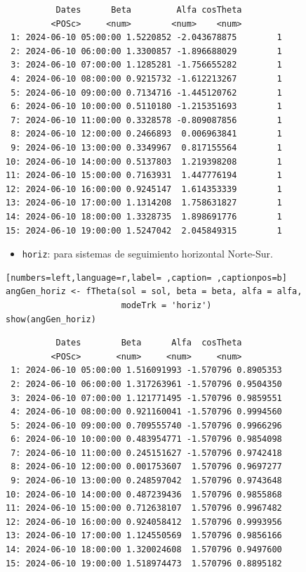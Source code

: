 \begin{itemize}
\begin{verbatim}
		  Dates      Beta         Alfa cosTheta
		 <POSc>     <num>        <num>    <num>
 1: 2024-06-10 05:00:00 1.5220852 -2.043678875        1
 2: 2024-06-10 06:00:00 1.3300857 -1.896688029        1
 3: 2024-06-10 07:00:00 1.1285281 -1.756655282        1
 4: 2024-06-10 08:00:00 0.9215732 -1.612213267        1
 5: 2024-06-10 09:00:00 0.7134716 -1.445120762        1
 6: 2024-06-10 10:00:00 0.5110180 -1.215351693        1
 7: 2024-06-10 11:00:00 0.3328578 -0.809087856        1
 8: 2024-06-10 12:00:00 0.2466893  0.006963841        1
 9: 2024-06-10 13:00:00 0.3349967  0.817155564        1
10: 2024-06-10 14:00:00 0.5137803  1.219398208        1
11: 2024-06-10 15:00:00 0.7163931  1.447776194        1
12: 2024-06-10 16:00:00 0.9245147  1.614353339        1
13: 2024-06-10 17:00:00 1.1314208  1.758631827        1
14: 2024-06-10 18:00:00 1.3328735  1.898691776        1
15: 2024-06-10 19:00:00 1.5247042  2.045849315        1
\end{verbatim}

\begin{itemize}
\item \texttt{horiz}: para sistemas de seguimiento horizontal Norte-Sur.
\end{itemize}
\begin{lstlisting}[numbers=left,language=r,label= ,caption= ,captionpos=b]
angGen_horiz <- fTheta(sol = sol, beta = beta, alfa = alfa,
                       modeTrk = 'horiz')
show(angGen_horiz)
\end{lstlisting}

\begin{verbatim}
		  Dates        Beta      Alfa  cosTheta
		 <POSc>       <num>     <num>     <num>
 1: 2024-06-10 05:00:00 1.516091993 -1.570796 0.8905353
 2: 2024-06-10 06:00:00 1.317263961 -1.570796 0.9504350
 3: 2024-06-10 07:00:00 1.121771495 -1.570796 0.9859551
 4: 2024-06-10 08:00:00 0.921160041 -1.570796 0.9994560
 5: 2024-06-10 09:00:00 0.709555740 -1.570796 0.9966296
 6: 2024-06-10 10:00:00 0.483954771 -1.570796 0.9854098
 7: 2024-06-10 11:00:00 0.245151627 -1.570796 0.9742418
 8: 2024-06-10 12:00:00 0.001753607  1.570796 0.9697277
 9: 2024-06-10 13:00:00 0.248597042  1.570796 0.9743648
10: 2024-06-10 14:00:00 0.487239436  1.570796 0.9855868
11: 2024-06-10 15:00:00 0.712638107  1.570796 0.9967482
12: 2024-06-10 16:00:00 0.924058412  1.570796 0.9993956
13: 2024-06-10 17:00:00 1.124550569  1.570796 0.9856166
14: 2024-06-10 18:00:00 1.320024608  1.570796 0.9497600
15: 2024-06-10 19:00:00 1.518974473  1.570796 0.8895182
\end{verbatim}


\end{itemize}
